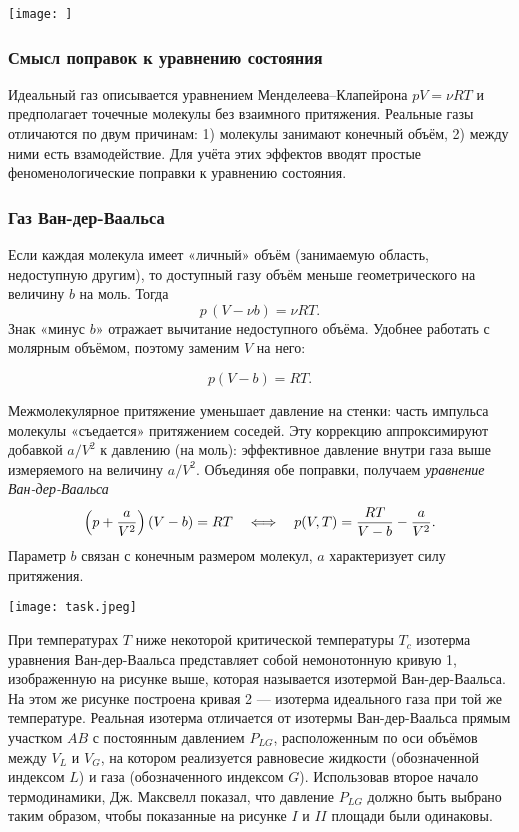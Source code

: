 \documentclass[12pt, a4paper]{article}%
\begin{document}
\begin{center}
\texttt{[image: ]}
\label{fig:mpr}
\end{center}

\subsubsection*{Смысл поправок к уравнению состояния}
Идеальный газ описывается уравнением Менделеева–Клапейрона \(pV=\nu RT\) и предполагает точечные молекулы без взаимного притяжения. Реальные газы отличаются по двум причинам: 1) молекулы занимают конечный объём, 2) между ними есть взамодействие. Для учёта 
этих эффектов вводят простые феноменологические поправки к уравнению состояния.

\subsubsection*{Газ Ван-дер-Ваальса}
Если каждая молекула имеет «личный» объём (занимаемую область, недоступную другим), то доступный газу объём меньше геометрического на величину \(b\) на моль. Тогда
\[
p\,(V-\nu b)=\nu RT.
\]
Знак «минус \(b\)» отражает вычитание недоступного объёма. Удобнее работать с молярным объёмом, поэтому заменим $V$ на него:

\[
p(V-b) = RT.
\]

Межмолекулярное притяжение уменьшает давление на стенки: часть импульса молекулы «съедается» притяжением соседей. Эту коррекцию аппроксимируют добавкой \(a/V^2\) к давлению (на моль): эффективное давление внутри газа выше измеряемого на величину \(a/V^2\). Объединяя обе поправки, получаем \textit{уравнение Ван-дер-Ваальса}
\[
\Bigl(p+\frac{a}{V^2}\Bigr)\,(V-b)=RT \quad\Longleftrightarrow\quad p(V,T)=\frac{RT}{V-b}-\frac{a}{V^2}.
\]
Параметр \(b\) связан с конечным размером молекул, \(a\) характеризует силу притяжения.

\begin{center}
\texttt{[image: task.jpeg]}
\label{fig:mpr}
\end{center}

При температурах \(T\) ниже некоторой критической температуры \(T_c\) изотерма
уравнения Ван-дер-Ваальса представляет собой немонотонную кривую 1, изображенную на рисунке выше,
которая называется изотермой Ван-дер-Ваальса. На этом же рисунке построена кривая
2 — изотерма идеального газа при той же температуре. Реальная изотерма отличается
от изотермы Ван-дер-Ваальса прямым участком \(AB\) с постоянным давлением
\(P_{LG}\), расположенным по оси объёмов между \(V_L\) и \(V_G\), на котором
реализуется равновесие жидкости (обозначенной индексом \(L\)) и газа
(обозначенного индексом \(G\)). Использовав второе начало термодинамики, Дж.
Максвелл показал, что давление \(P_{LG}\) должно быть выбрано таким образом,
чтобы показанные на рисунке \(I\) и \(II\) площади были одинаковы.
\end{document}
